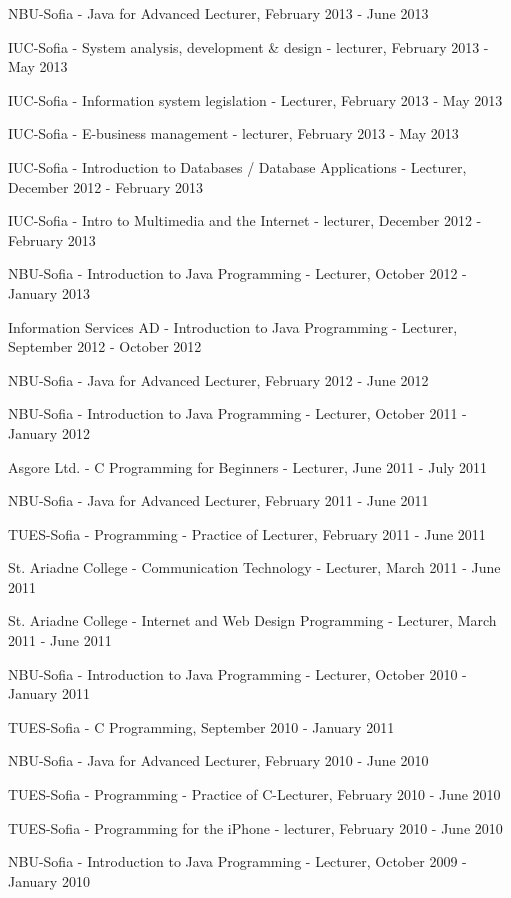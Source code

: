 \documentclass[english,a4paper]{europasscv}
\begin{document}
\begin{europasscv}
{\begin{ecvitemize}
    \item NBU-Sofia - Java for Advanced Lecturer, February 2013 - June 2013
    \item IUC-Sofia - System analysis, development \& design - lecturer, February 2013 - May 2013
    \item IUC-Sofia - Information system legislation - Lecturer, February 2013 - May 2013
    \item IUC-Sofia - E-business management - lecturer, February 2013 - May 2013
    \item IUC-Sofia - Introduction to Databases / Database Applications - Lecturer, December 2012 - February 2013
    \item IUC-Sofia - Intro to Multimedia and the Internet - lecturer, December 2012 - February 2013
        \item NBU-Sofia - Introduction to Java Programming - Lecturer, October 2012 - January 2013
    \item Information Services AD - Introduction to Java Programming - Lecturer, September 2012 - October 2012
    \item NBU-Sofia - Java for Advanced Lecturer, February 2012 - June 2012
    \item NBU-Sofia - Introduction to Java Programming - Lecturer, October 2011 - January 2012
    \item Asgore Ltd. - C Programming for Beginners - Lecturer, June 2011 - July 2011
    \item NBU-Sofia - Java for Advanced Lecturer, February 2011 - June 2011
    \item TUES-Sofia - Programming - Practice of Lecturer, February 2011 - June 2011
    \item St. Ariadne College - Communication Technology - Lecturer, March 2011 - June 2011
    \item St. Ariadne College - Internet and Web Design Programming - Lecturer, March 2011 - June 2011
    \item NBU-Sofia - Introduction to Java Programming - Lecturer, October 2010 - January 2011
    \item TUES-Sofia - C Programming, September 2010 - January 2011
    \item NBU-Sofia - Java for Advanced Lecturer, February 2010 - June 2010
    \item TUES-Sofia - Programming - Practice of C-Lecturer, February 2010 - June 2010
    \item TUES-Sofia - Programming for the iPhone - lecturer, February 2010 - June 2010
    \item NBU-Sofia - Introduction to Java Programming - Lecturer, October 2009 - January 2010

\end{ecvitemize}}
\end{europasscv}
\end{document}
